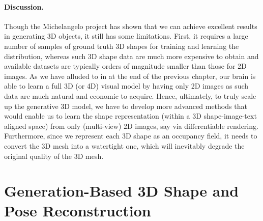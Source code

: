 \documentclass[../../book-main.tex]{subfiles}
\begin{document}
\paragraph{Discussion.}
Though the Michelangelo project has shown that we can achieve
excellent results in generating 3D objects, it still has some
limitations.
First, it requires a large number of samples of ground
truth 3D shapes for training and learning the distribution, whereas
such 3D shape data are much more expensive to obtain and available
datasets are typically orders of magnitude smaller than those for 2D
images.
As we have alluded to in  at the
end of the previous chapter, our brain is able to learn a full 3D (or
4D) visual model by having only 2D images as such data are much
natural and economic to acquire.
Hence, ultimately, to truly scale up
the generative 3D model, we have to develop more advanced methods
that would enable us to learn the shape representation (within a 3D
shape-image-text aligned space) from only (multi-view) 2D images, say
via differentiable rendering.
Furthermore, since we represent each 3D shape as an occupancy field,
it needs to convert the 3D mesh into a watertight one, which will
inevitably degrade the original quality of the 3D mesh.

\section{Generation-Based 3D Shape and Pose Reconstruction}\label{sec:CUPID}\label{sec:shape-and-pose}

\newcommand{\pose}{\vxi}
\newcommand{\object}{\cO}
\newcommand{\Image}{\vI}
\newcommand{\image}{\vI}
\newcommand{\render}{\cP}
\newcommand{\latent}{\vz}
\newcommand{\timestep}{t}
\newcommand{\latentt}{\vz_{\timestep}}
\newcommand{\latentzero}{\vz_{0}}
\newcommand{\noise}{\vepsilon}
\newcommand{\velocity}{\vv}
\newcommand{\parameter}{\vphi}
\newcommand{\encoder}{\varphi}
\newcommand{\point}{\vx}
\newcommand{\pixcoord}{\vu}
\newcommand{\feat}{\vf}
\newcommand{\sflow}{\cG_{\mathrm{S}}}
\newcommand{\lflow}{\cG_{\mathrm{L}}}
\newcommand{\transpose}{\top}
\newcommand{\Grid}{\vG}
\newcommand{\sgrid}{\vS}
\newcommand{\numpts}{L}
\newcommand{\sres}{D}
\newcommand{\vaeencoder}{\psi}
\newcommand{\trellis}{\textsc{Trellis}}
\newcommand{\interp}{\operatorname{BilinearInterp}}
\newcommand{\slatenc}{\operatorname{SlatEncoder}}
\newcommand{\twotothree}{2D \(\to\) 3D}
\newcommand{\threetotwo}{3D \(\to\) 2D}
\newcommand{\low}{\mathrm{l}}
\newcommand{\high}{\mathrm{h}}
\end{document}
